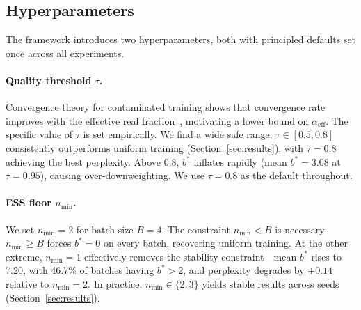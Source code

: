 \subsection{Hyperparameters}
\label{sec:hyperparameters}

The framework introduces two hyperparameters, both with principled defaults set once across all experiments.

\paragraph{Quality threshold $\tau$.}
Convergence theory for contaminated training shows that convergence rate improves with the effective real fraction~\citep{wang_2026_survive_contamination}, motivating a lower bound on $\alpha_{\mathrm{eff}}$.
The specific value of $\tau$ is set empirically.
We find a wide safe range: $\tau \in [0.5, 0.8]$ consistently outperforms uniform training (Section~\ref{sec:results}), with $\tau = 0.8$ achieving the best perplexity.
Above 0.8, $b^{*}$ inflates rapidly (mean $b^{*} = 3.08$ at $\tau = 0.95$), causing over-downweighting.
We use $\tau = 0.8$ as the default throughout.

\paragraph{ESS floor $n_{\min}$.}
We set $n_{\min} = 2$ for batch size $B = 4$.
The constraint $n_{\min} < B$ is necessary: $n_{\min} \geq B$ forces $b^{*} = 0$ on every batch, recovering uniform training.
At the other extreme, $n_{\min} = 1$ effectively removes the stability constraint---mean $b^{*}$ rises to 7.20, with 46.7\% of batches having $b^{*} > 2$, and perplexity degrades by $+0.14$ relative to $n_{\min} = 2$.
In practice, $n_{\min} \in \{2, 3\}$ yields stable results across seeds (Section~\ref{sec:results}).
